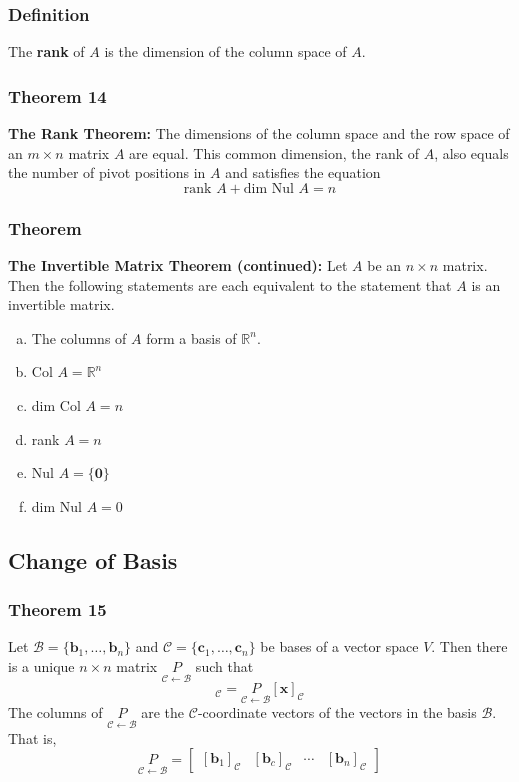 \documentclass[letterpaper,11pt]{article}
\begin{document}
			\subsubsection{Definition}
				The \textbf{rank} of $A$ is the dimension of the column space of $A$.
			\subsubsection{Theorem 14}
				\textbf{The Rank Theorem:} The dimensions of the column space and the row space of an $m\times n$ matrix $A$ are equal. This common dimension, the rank of $A$, also equals the number of pivot positions in $A$ and satisfies the equation
				\begin{equation}
					\textrm{rank }A+\textrm{dim Nul }A=n
				\end{equation}
			\subsubsection{Theorem}
				\textbf{The Invertible Matrix Theorem (continued):} Let $A$ be an $n\times n$ matrix. Then the following statements are each equivalent to the statement that $A$ is an invertible matrix.
				\begin{enumerate}[a.]
					\item The columns of $A$ form a basis of $\mathbb{R}^n$.
					\item Col $A=\mathbb{R}^n$
					\item dim Col $A=n$
					\item rank $A=n$
					\item Nul $A=\{\mathbf{0}\}$
					\item dim Nul $A=0$
				\end{enumerate}
		\subsection{Change of Basis}
			\subsubsection{Theorem 15}
				Let $\mathcal{B}=\{\mathbf{b}_1,\dots,\mathbf{b}_n\}$ and $\mathcal{C}=\{\mathbf{c}_1,\dots,\mathbf{c}_n\}$ be bases of a vector space $V$. Then there is a unique $n\times n$ matrix $\underset{\mathcal{C}\longleftarrow\mathcal{B}}{P}$ such that
				\begin{equation}
					[\mathbf{x}]_\mathcal{C}=\underset{\mathcal{C}\longleftarrow\mathcal{B}}{P}[\mathbf{x}]_\mathcal{C}
				\end{equation}
				The columns of $\underset{\mathcal{C}\longleftarrow\mathcal{B}}{P}$ are the $\mathcal{C}$-coordinate vectors of the vectors in the basis $\mathcal{B}$. That is,
				\begin{equation}
					\underset{\mathcal{C}\longleftarrow\mathcal{B}}{P}=\begin{bmatrix}
						[\mathbf{b}_1]_\mathcal{C} & [\mathbf{b}_c]_\mathcal{C} & \cdots & [\mathbf{b}_n]_\mathcal{C}
					\end{bmatrix}
				\end{equation}
\end{document}
